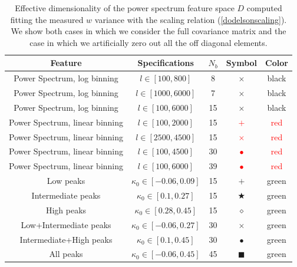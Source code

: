 \documentclass[reprint,aps,prd,superscriptaddress,showkeys,showpacs]{revtex4-1}
\begin{document}
\begin{table}
\begin{center}
\begin{tabular}{ccccc}
\toprule
\textbf{Feature} &  \textbf{Specifications} & $N_b$ &  \textbf{Symbol} & \textbf{Color} \\ \hline \hline
\midrule
Power Spectrum, log binning  & $l \in [100,800] $ & 8 & $\times$ & black  \\ 
Power Spectrum, log binning  & $l \in [1000,6000] $ & 7 & $\times$ & black  \\ 
Power Spectrum, log binning  & $l \in [100,6000] $ & 15 & $\times$ & black  \\
Power Spectrum, linear binning  & $l \in [100,2000] $ & 15 & \textcolor{red}{$+$} & \textcolor{red}{red}  \\ 
Power Spectrum, linear binning  & $l \in [2500,4500] $ & 15 & \textcolor{red}{$\times$} & \textcolor{red}{red}  \\
Power Spectrum, linear binning  & $l \in [100,4500] $ & 30 & \textcolor{red}{$\bullet$} & \textcolor{red}{red}  \\ 
Power Spectrum, linear binning  & $l \in [100,6000] $ & 39 & \textcolor{red}{$\bullet$} & \textcolor{red}{red}  \\ \hline
Low peaks  & $\kappa_0 \in [-0.06,0.09] $ & 15 & \textcolor{OliveGreen}{$+$} & \textcolor{OliveGreen}{green}  \\ 
Intermediate peaks  & $\kappa_0 \in [0.1,0.27] $ & 15 & \textcolor{OliveGreen}{$\bigstar$} & \textcolor{OliveGreen}{green}  \\ 
High peaks  & $\kappa_0 \in [0.28,0.45] $ & 15 & \textcolor{OliveGreen}{$\diamond$} & \textcolor{OliveGreen}{green}  \\
Low+Intermediate peaks  & $\kappa_0 \in [-0.06,0.27] $ & 30 & \textcolor{OliveGreen}{$\times$} & \textcolor{OliveGreen}{green}  \\
Intermediate+High peaks  & $\kappa_0 \in [0.1,0.45] $ & 30 & \textcolor{OliveGreen}{$\bullet$} & \textcolor{OliveGreen}{green}  \\
All peaks  & $\kappa_0 \in [-0.06,0.45] $ & 45 & \textcolor{OliveGreen}{$\blacksquare$} & \textcolor{OliveGreen}{green}  \\ \hline
\bottomrule
\end{tabular}
\end{center}
\caption{Effective dimensionality of the power spectrum feature space $D$ computed fitting the measured $w$ variance with the scaling relation (\ref{dodelsonscaling}). We show both cases in which we consider the full covariance matrix and the case in which we artificially zero out all the off diagonal elements.}
\label{dimtable}
\end{table}
\end{document}
